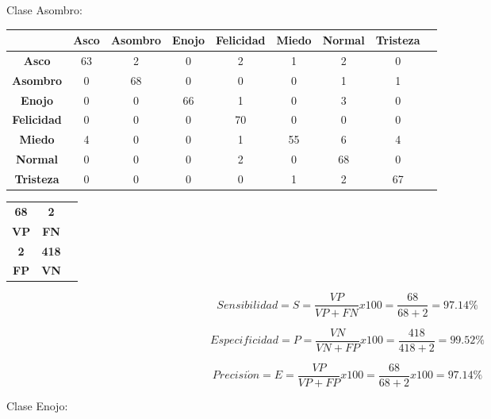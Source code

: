 Clase Asombro:

\begin{table}[ht!]
\centering
\begin{tabular}{|c|c|c|c|c|c|c|c|c|} \hline
 & \bf Asco & \bf Asombro & \bf Enojo & \bf Felicidad & \bf Miedo & \bf Normal & \bf Tristeza \\ \hline
\bf Asco & 63 & 2 & 0 & 2 & 1 & 2 & 0 \\ \hline
\bf Asombro & 0 & 68 & 0 & 0 & 0 & 1 & 1 \\ \hline
\bf Enojo & 0 & 0 & 66 & 1 & 0 & 3 & 0 \\ \hline
\bf Felicidad & 0 & 0 & 0 & 70 & 0 & 0 & 0 \\ \hline
\bf Miedo & 4 & 0 & 0 & 1 & 55 & 6 & 4 \\ \hline
\bf Normal & 0 & 0 & 0 & 2 & 0 & 68 & 0 \\ \hline
\bf Tristeza & 0 & 0 & 0 & 0 & 1 & 2 & 67 \\ \hline

\end{tabular}
\end{table}

\begin{table}[ht!]
\centering
\begin{tabular}{|c|c|c|} \hline
\bf 68 \par & \bf 2 \par \\
\bf VP & \bf FN \\ \hline
\bf 2 \par & \bf 418 \par \\ 
\bf FP & \bf VN \\ \hline 
\end{tabular}
\end{table}

\begin{equation}
Sensibilidad=S=\frac{VP}{VP+FN}x100=\frac{68}{68+2}=97.14\%
\end{equation}

\begin{equation}
Especificidad=P=\frac{VN}{VN+FP}x100=\frac{418}{418+2}=99.52\%
\end{equation}

\begin{equation}
Precisi\acute{o}n=E=\frac{VP}{VP+FP}x100=\frac{68}{68+2}x100=97.14\%
\end{equation}

\vskip 5cm

Clase Enojo:

